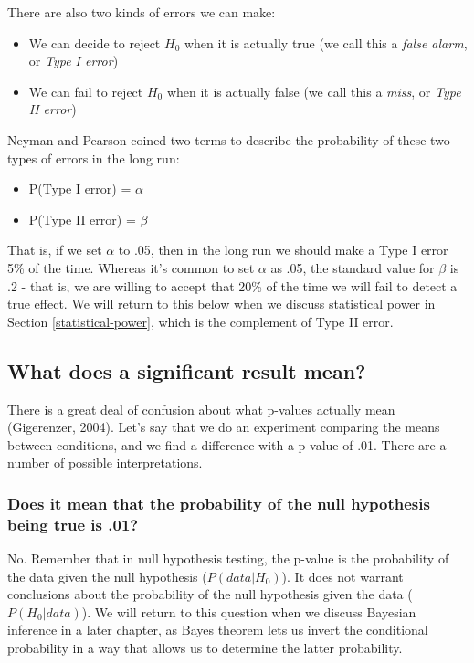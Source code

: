 \documentclass[]{book}
\providecommand{\tightlist}{%
  \setlength{\itemsep}{0pt}\setlength{\parskip}{0pt}}
\theoremstyle{definition}
\theoremstyle{definition}
\theoremstyle{definition}
\theoremstyle{remark}
\begin{document}
There are also two kinds of errors we can make:

\begin{itemize}
\tightlist
\item
  We can decide to reject \(H_0\) when it is actually true (we call this
  a \emph{false alarm}, or \emph{Type I error})
\item
  We can fail to reject \(H_0\) when it is actually false (we call this
  a \emph{miss}, or \emph{Type II error})
\end{itemize}

Neyman and Pearson coined two terms to describe the probability of these
two types of errors in the long run:

\begin{itemize}
\tightlist
\item
  P(Type I error) = \(\alpha\)
\item
  P(Type II error) = \(\beta\)
\end{itemize}

That is, if we set \(\alpha\) to .05, then in the long run we should
make a Type I error 5\% of the time. Whereas it's common to set
\(\alpha\) as .05, the standard value for \(\beta\) is .2 - that is, we
are willing to accept that 20\% of the time we will fail to detect a
true effect. We will return to this below when we discuss statistical
power in Section \ref{statistical-power}, which is the complement of
Type II error.

\subsection{What does a significant result
mean?}\label{what-does-a-significant-result-mean}

There is a great deal of confusion about what p-values actually mean
(Gigerenzer, 2004). Let's say that we do an experiment comparing the
means between conditions, and we find a difference with a p-value of
.01. There are a number of possible interpretations.

\subsubsection{Does it mean that the probability of the null hypothesis
being true is
.01?}\label{does-it-mean-that-the-probability-of-the-null-hypothesis-being-true-is-.01}

No. Remember that in null hypothesis testing, the p-value is the
probability of the data given the null hypothesis (\(P(data|H_0)\)). It
does not warrant conclusions about the probability of the null
hypothesis given the data (\(P(H_0|data)\)). We will return to this
question when we discuss Bayesian inference in a later chapter, as Bayes
theorem lets us invert the conditional probability in a way that allows
us to determine the latter probability.
\end{document}
